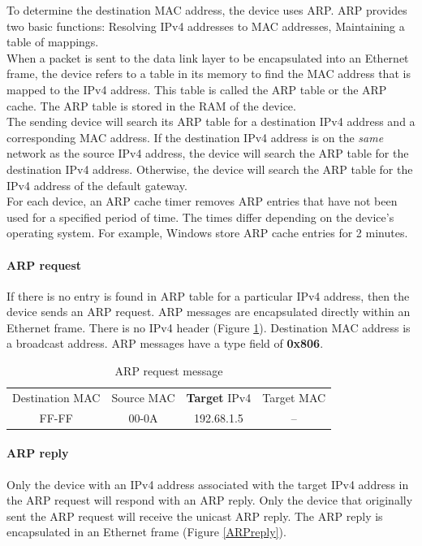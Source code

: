 To determine the destination MAC address, the device uses ARP. ARP provides two basic functions: Resolving IPv4 addresses to MAC addresses, Maintaining a table of mappings. \\

When a packet is sent to the data link layer to be encapsulated into an Ethernet frame, the device refers to a table in its memory to find the MAC address that is mapped to the IPv4 address. This table is called the ARP table or the ARP cache. The ARP table is stored in the RAM of the device. \\

The sending device will search its ARP table for a destination IPv4 address and a corresponding MAC address. If the destination IPv4 address is on the \emph{same} network as the source IPv4 address, the device will search the ARP table for the destination IPv4 address. Otherwise, the device will search the ARP table for the IPv4 address of the default gateway.\\

For each device, an ARP cache timer removes ARP entries that have not been used for a specified period of time. The times differ depending on the device's operating system. For example, Windows store ARP cache entries for 2 minutes.\\

\paragraph{ARP request} If there is no entry is found in ARP table for a particular IPv4 address, then the device sends an ARP request. ARP messages are encapsulated directly within an Ethernet frame. There is no IPv4 header (Figure \ref{ARPrequest}). Destination MAC address is a broadcast address. ARP messages have a type field of \textbf{0x806}. 

\begin{table}[hbtp]
\centering\caption{ARP request message}\label{ARPrequest}
\begin{tabular}{|c|c|c|c|}
\toprule
Destination MAC & Source MAC & \textbf{Target} IPv4 & Target MAC \\
FF-FF & 00-0A & 192.68.1.5 & -- \\
\bottomrule
\end{tabular}
\end{table}

\paragraph{ARP reply} Only the device with an IPv4 address associated with the target IPv4 address in the ARP request will respond with an ARP reply. Only the device that originally sent the ARP request will receive the unicast ARP reply. The ARP reply is encapsulated in an Ethernet frame (Figure \ref{ARPreply}).

